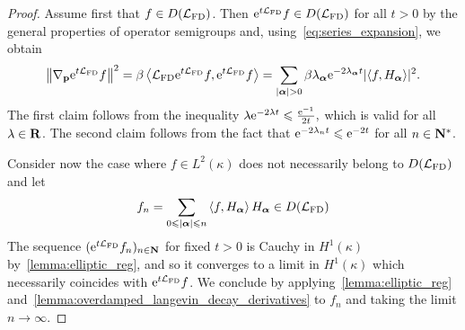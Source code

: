 \documentclass[11pt,a4paper]{article}
\begin{document}
\begin{proof}
    Assume first that $f \in D(\mathcal L_{\rm FD})$.
    Then $\mathrm{e}^{t \mathcal L_{\rm FD} } f \in D(\mathcal L_{\rm FD})$ for all $t > 0$ by the general properties of operator semigroups and,
    using~\eqref{eq:series_expansion}, we obtain
    \begin{equation}
        \label{eq:gradient_series}
        \norm{\grad_{\vect p} \e^{t \mathcal L_{\rm FD}} f}^2 = \beta \ip{\mathcal L_{\rm FD} \e^{t \mathcal L_{\rm FD}} f}{\e^{t \mathcal L_{\rm FD}} f}
        = \sum_{\abs{\vect \alpha} > 0} \beta \lambda_{\vect \alpha} \e^{- 2\lambda_{\vect \alpha} t} \lvert \ip{f}{H_{\vect \alpha}} \rvert^2.
    \end{equation}
    The first claim follows from the inequality
    \(
        \lambda \mathrm{e}^{- 2\lambda t} \leqslant \frac{\mathrm{e}^{-1}}{2 t},
    \)
    which is valid for all $\lambda \in \mathbf R$.
    The second claim follows from the fact that $\mathrm{e}^{-2\lambda_n t} \leqslant \mathrm{e}^{-2t}$ for all $n \in \mathbf N^*$.


    Consider now the case where $f \in L^2(\kappa)$ does not necessarily belong to $D(\mathcal L_{\rm FD})$
    and let
    \[
        f_n = \sum_{0 \leq \abs{\vect \alpha} \leq n} \ip{f}{H_{\vect \alpha}} H_{\vect \alpha} \in D(\mathcal L_{\rm FD})
    \]
    The sequence $(\mathrm{e}^{t \mathcal L_{\rm FD}}f_n)_{n\in \mathbf N}$ for fixed $t > 0$ is Cauchy in $H^1(\kappa)$ by~\eqref{lemma:elliptic_reg},
    and so it converges to a limit in $H^1(\kappa)$ which necessarily coincides with $\mathrm{e}^{t \mathcal L_{\rm FD}} f$.
    We conclude by applying~\eqref{lemma:elliptic_reg} and~\eqref{lemma:overdamped_langevin_decay_derivatives} to $f_n$ and taking the limit $n \to \infty$.
\end{proof}

\end{document}
